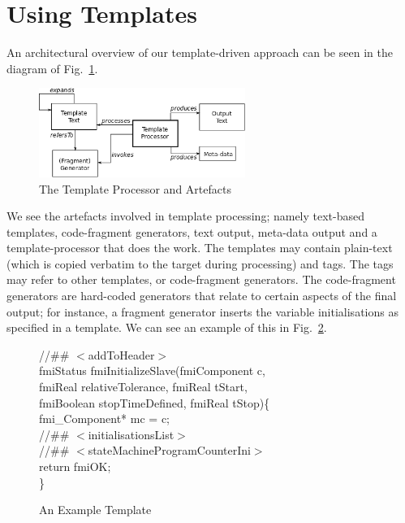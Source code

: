 \documentclass{llncs}%
\begin{document}
\section{Using Templates}\label{templates}
An architectural overview of our template-driven approach can be seen in the diagram of Fig.~\ref{fig:templates}.
%
\begin{figure}
\vspace*{-12pt}
\centering
\includegraphics[width=0.6\textwidth]{templateOverview.png}
\caption{The Template Processor and Artefacts}
\label{fig:templates}
\vspace*{-5pt}
\end{figure}
%
We see the artefacts involved in template processing; namely text-based templates, code-fragment generators, text output, meta-data output and a template-processor that does the work. The templates may contain plain-text (which is copied verbatim to the target during processing) and tags. The tags may refer to other templates, or code-fragment generators. The code-fragment generators are hard-coded generators that relate to certain aspects of the final output; for instance, a fragment generator inserts the variable initialisations as specified in a template. We can see an example of this in Fig.~\ref{fig:templateExample}. 
%
\begin{figure}
\begin{center}
\begin{minipage}{0.6\textwidth}
\vspace*{-5pt}
\begin{spacing}{0.8}
\small
//\#\# $<$addToHeader$>$\\
fmiStatus fmiInitializeSlave(fmiComponent c,\\
\hspace*{0.2cm}fmiReal relativeTolerance, fmiReal tStart,\\
\hspace*{0.2cm}fmiBoolean stopTimeDefined, fmiReal tStop)\{\\
\hspace*{0.4cm}fmi\_Component* mc = c;\\
\hspace*{0.4cm}//\#\# $<$initialisationsList$>$\\
\hspace*{0.4cm}//\#\# $<$stateMachineProgramCounterIni$>$\\
\hspace*{0.4cm}return fmiOK;\\
\}
\normalsize
\end{spacing}
\caption{An Example Template}
\label{fig:templateExample}
\vspace*{-5pt}
\end{minipage}
\end{center}
\end{figure}
\end{document}

